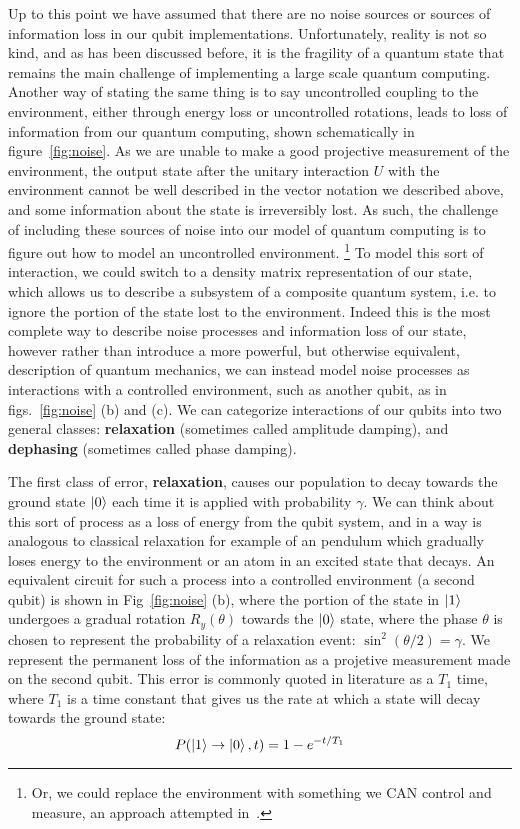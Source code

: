 Up to this point we have assumed that there are no noise sources or sources of information loss in our
qubit implementations. Unfortunately, reality is not so kind, and as has been discussed before, it is the
fragility of a quantum state that remains the main challenge of implementing a large scale quantum computing.
Another way of stating the same thing is to say uncontrolled coupling to the environment, either through
energy loss or uncontrolled rotations, leads to loss of information from our quantum computing, shown schematically
in figure~\ref{fig:noise}. As we are unable to make a good projective measurement of the environment, the output
state after the unitary interaction $U$ with the environment cannot be well described in the vector notation we
described above, and some information about the state is irreversibly lost. As such, the challenge of including
these sources of noise into our model of quantum computing is to figure out how to model an uncontrolled environment.
\footnote{Or, we could replace the environment with something we CAN control and measure, an approach attempted
in~\cite{2018arXiv180300545M}.}
To model this sort of interaction, we could switch to a density matrix representation of our state, which allows us
to describe a subsystem of a composite quantum system, i.e. to ignore the portion of the state lost to the environment.
Indeed this is the most complete way to describe noise processes and information loss of our state, however rather
than introduce a more powerful, but otherwise equivalent, description of quantum mechanics, we can instead model
noise processes as interactions with a controlled environment, such as another qubit, as in figs.~\ref{fig:noise} (b) and (c).
We can categorize interactions of our qubits into two general classes: \textbf{relaxation} (sometimes called amplitude
damping), and \textbf{dephasing} (sometimes called phase damping).

The first class of error, \textbf{relaxation}, causes our population to decay towards the ground state $\ket{0}$ each time it is
applied with probability $\gamma$. We can think about this sort of process as a loss of energy from the qubit system, and
in a way is analogous to classical relaxation for example of an pendulum which gradually loses energy to the environment
or an atom in an excited state that decays. An equivalent circuit for such a process into a controlled environment (a second qubit) is
shown in Fig~\ref{fig:noise} (b), where the portion of the state in $\ket{1}$ undergoes a gradual rotation $R_{y}(\theta)$
towards the $\ket{0}$ state, where the phase $\theta$ is chosen to represent the probability of a relaxation event:
$\sin^2(\theta/2) = \gamma$. We represent the permanent loss of the information as a projetive measurement made on the
second qubit. This error is commonly quoted in literature as a $T_1$ time, where $T_1$ is a time constant
that gives us the rate at which a state will decay towards the ground state:
\begin{equation}
  P(\ket{1} \rightarrow \ket{0}, t) = 1 - e^{-t/T_1}
\end{equation}


